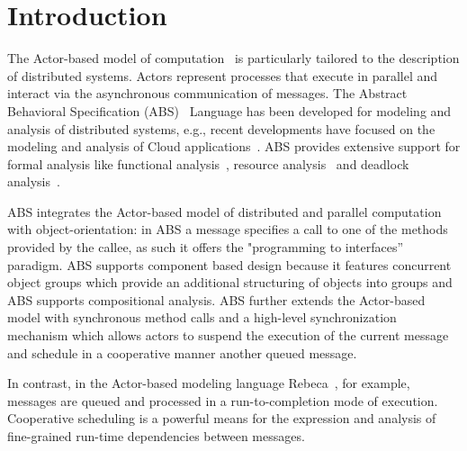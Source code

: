 \section{Introduction}

The Actor-based model of computation~\cite{Agha} is particularly tailored to the description of distributed systems. Actors represent processes that execute in parallel and interact via the asynchronous communication of messages. The Abstract Behavioral Specification (ABS)~\cite{abs} Language has been developed
for modeling and analysis of distributed systems, e.g., recent developments
have focused on the modeling and analysis of Cloud applications~\cite{Albert}.
ABS provides extensive support for formal analysis like functional analysis~\cite{KeY}, resource analysis~\cite{saco} and deadlock analysis~\cite{dead}.

 ABS integrates the Actor-based model of distributed and parallel computation with object-orientation:
in ABS a message specifies a call to one of the methods provided by the callee,
as such it offers the "programming to interfaces'' paradigm.
ABS supports component based design because it features concurrent object groups which provide an additional structuring of objects into groups and ABS supports compositional analysis. ABS further extends the Actor-based model with synchronous method calls and a high-level synchronization mechanism which allows actors to suspend the
execution of the current message and schedule in a cooperative manner another
queued message. 

In contrast, in the Actor-based modeling language Rebeca~\cite{Sirjani}, for example,
messages are queued and processed in a run-to-completion mode of execution.
Cooperative scheduling is a powerful means for the expression and analysis
of fine-grained run-time dependencies between messages.



